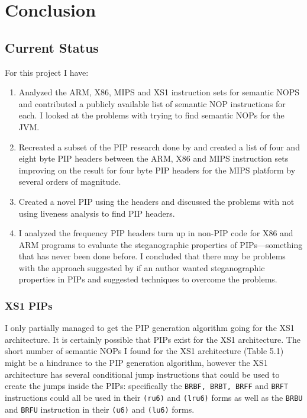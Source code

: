 \documentclass[10pt,]{book}
\begin{document}
\chapter{Conclusion}

\section{Current Status}

For this project I have:

\begin{enumerate}[1.]
\item
  Analyzed the ARM, X86, MIPS and XS1 instruction sets for semantic NOPS
  and contributed a publicly available list of semantic NOP instructions
  for each. I looked at the problems with trying to find semantic NOPs
  for the JVM.
\item
  Recreated a subset of the PIP research done by \autocite{Cha:2010uh}
  and created a list of four and eight byte PIP headers between the ARM,
  X86 and MIPS instruction sets improving on the result for four byte
  PIP headers for the MIPS platform by several orders of
  magnitude\autocite{Cha:2010uh}.
\item
  Created a novel PIP using the headers and discussed the problems with
  not using liveness analysis to find PIP headers.
\item
  I analyzed the frequency PIP headers turn up in non-PIP code for X86
  and ARM programs to evaluate the steganographic properties of
  PIPs---something that has never been done before. I concluded that
  there may be problems with the approach suggested by
  \autocite{Cha:2010uh} if an author wanted steganographic properties in
  PIPs and suggested techniques to overcome the problems.
\end{enumerate}
\subsection{XS1 PIPs}

I only partially managed to get the PIP generation algorithm going for
the XS1 architecture. It is certainly possible that PIPs exist for the
XS1 architecture. The short number of semantic NOPs I found for the XS1
architecture (Table 5.1) might be a hindrance to the PIP generation
algorithm, however the XS1 architecture has several conditional jump
instructions that could be used to create the jumps inside the PIPs:
specifically the \lstinline!BRBF, BRBT, BRFF! and \lstinline!BRFT!
instructions could all be used in their \lstinline!(ru6)! and
\lstinline!(lru6)! forms as well as the \lstinline!BRBU! and
\lstinline!BRFU! instruction in their \lstinline!(u6)! and
\lstinline!(lu6)! forms\autocite{May:ua}.
\end{document}
